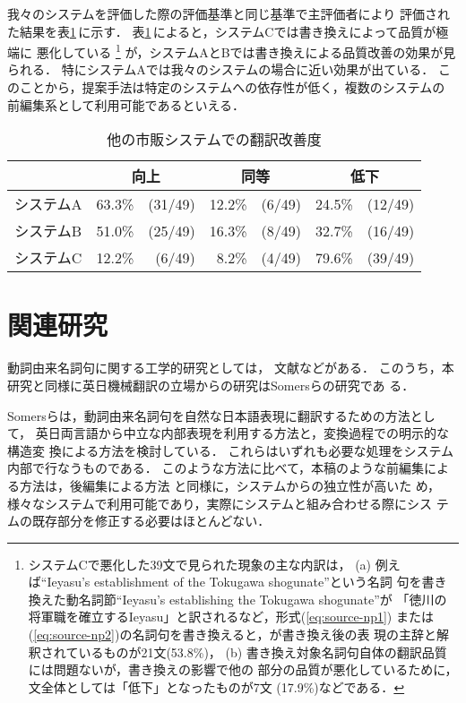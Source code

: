 我々のシステムを評価した際の評価基準と同じ基準で主評価者により
評価された結果を表\ref{tab:others}\,に示す．
表\ref{tab:others}\,によると，システムCでは書き換えによって品質が極端に
悪化している
\footnote{システムCで悪化した39文で見られた現象の主な内訳は，
(a) 例えば``Ieyasu's establishment of the Tokugawa shogunate''という名詞
句を書き換えた動名詞節``Ieyasu's establishing the Tokugawa shogunate''が
「徳川の将軍職を確立するIeyasu」と訳されるなど，形式(\ref{eq:source-np1})
または(\ref{eq:source-np2})の名詞句を書き換えると，\NP が書き換え後の表
現の主辞と解釈されているものが21文(53.8\%)，
(b) 書き換え対象名詞句自体の翻訳品質には問題ないが，書き換えの影響で他の
部分の品質が悪化しているために，文全体としては「低下」となったものが7文
(17.9\%)などである．}
が，システムAとBでは書き換えによる品質改善の効果が見られる． 
特にシステムAでは我々のシステムの場合に近い効果が出ている．
このことから，提案手法は特定のシステムへの依存性が低く，複数のシステムの
前編集系として利用可能であるといえる．
\begin{table}[htbp]
\caption{他の市販システムでの翻訳改善度}
\label{tab:others}
\begin{center}
\begin{tabular}{|c||r@{}r|r@{}r|r@{}r|} \hline
 & \multicolumn{2}{c}{向上} & \multicolumn{2}{|c|}{同等} & 
\multicolumn{2}{|c|}{低下} \\\hline\hline
システムA & 63.3\% & (31/49) & 12.2\% & (6/49) & 24.5\% & (12/49) \\ 
システムB & 51.0\% & (25/49) & 16.3\% & (8/49) & 32.7\% & (16/49) \\ 
システムC & 12.2\% &  (6/49) &  8.2\% & (4/49) & 79.6\% & (39/49) \\\hline 
\end{tabular}
\end{center}
\end{table}

\section{関連研究}
\label{sec:related-work}

動詞由来名詞句に関する工学的研究としては，
文献\cite{Hobbs76,Dahl87,Somers88,Hull96,Macleod98}などがある．
このうち，本研究と同様に英日機械翻訳の立場からの研究はSomersらの研究であ
る．

Somersらは，動詞由来名詞句を自然な日本語表現に翻訳するための方法として，
英日両言語から中立な内部表現を利用する方法と，変換過程での明示的な構造変
換による方法を検討している．
これらはいずれも必要な処理をシステム内部で行なうものである．
このような方法に比べて，本稿のような前編集による方法は，後編集による方法
\cite{Knight94,Yamamoto99,Ozaki01}と同様に，システムからの独立性が高いた
め，様々なシステムで利用可能であり，実際にシステムと組み合わせる際にシス
テムの既存部分を修正する必要はほとんどない．


